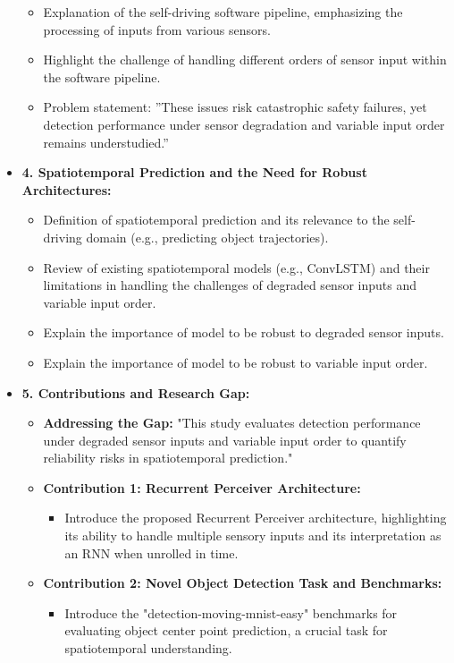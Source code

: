 \begin{itemize}
    \begin{itemize}
        \item Explanation of the self-driving software pipeline, emphasizing the processing of inputs from various sensors.
        \item Highlight the challenge of handling different orders of sensor input within the software pipeline.
        \item Problem statement: ”These issues risk catastrophic safety failures, yet detection performance under sensor degradation and variable input order remains understudied.”
    \end{itemize}
    \item \textbf{4. Spatiotemporal Prediction and the Need for Robust Architectures:}
    \begin{itemize}
        \item Definition of spatiotemporal prediction and its relevance to the self-driving domain (e.g., predicting object trajectories).
        \item Review of existing spatiotemporal models (e.g., ConvLSTM) and their limitations in handling the challenges of degraded sensor inputs and variable input order.
        \item Explain the importance of model to be robust to degraded sensor inputs.
        \item Explain the importance of model to be robust to variable input order.
    \end{itemize}
    \item \textbf{5. Contributions and Research Gap:}
    \begin{itemize}
        \item \textbf{Addressing the Gap:} "This study evaluates detection performance under degraded sensor inputs and variable input order to quantify reliability risks in spatiotemporal prediction."
        \item \textbf{Contribution 1: Recurrent Perceiver Architecture:}
        \begin{itemize}
            \item Introduce the proposed Recurrent Perceiver architecture, highlighting its ability to handle multiple sensory inputs and its interpretation as an RNN when unrolled in time.
        \end{itemize}
        \item \textbf{Contribution 2: Novel Object Detection Task and Benchmarks:}
        \begin{itemize}
            \item Introduce the "detection-moving-mnist-easy" benchmarks for evaluating object center point prediction, a crucial task for spatiotemporal understanding.

\end{itemize}
\end{itemize}
\end{itemize}
